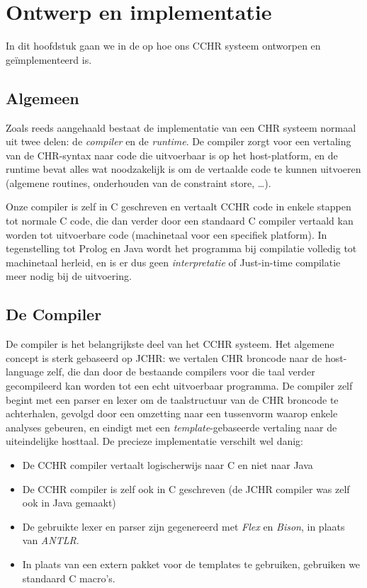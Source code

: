 \chapter{Ontwerp en implementatie}

In dit hoofdstuk gaan we in de op hoe ons CCHR systeem ontworpen en ge\"implementeerd is.

\section{Algemeen}

Zoals reeds aangehaald bestaat de implementatie van een CHR systeem normaal uit twee delen: de {\em compiler} en de {\em runtime}. De compiler zorgt voor een vertaling van de CHR-syntax naar code die uitvoerbaar is op het host-platform, en de runtime bevat alles wat noodzakelijk is om de vertaalde code te kunnen uitvoeren (algemene routines, onderhouden van de constraint store, \ldots).

Onze compiler is zelf in C geschreven en vertaalt CCHR code in enkele stappen tot normale C code, die dan verder door een standaard C compiler vertaald kan worden tot uitvoerbare code (machinetaal voor een specifiek platform). In tegenstelling tot Prolog en Java wordt het programma bij compilatie volledig tot machinetaal herleid, en is er dus geen {\em interpretatie} of {Just-in-time compilatie} meer nodig bij de uitvoering.

\section{De Compiler}

De compiler is het belangrijkste deel van het CCHR systeem. Het algemene concept is sterk gebaseerd op JCHR: we vertalen CHR broncode naar de host-language zelf, die dan door de bestaande compilers voor die taal verder gecompileerd kan worden tot een echt
uitvoerbaar programma. De compiler zelf begint met een parser en lexer om de taalstructuur van de CHR broncode te achterhalen, gevolgd door een omzetting naar een tussenvorm waarop enkele analyses gebeuren, en eindigt met een {\em template}-gebaseerde vertaling naar de uiteindelijke hosttaal. De precieze implementatie verschilt wel danig: \begin{itemize}
  \item De CCHR compiler vertaalt logischerwijs naar C en niet naar Java
  \item De CCHR compiler is zelf ook in C geschreven (de JCHR compiler was zelf ook in Java gemaakt)
  \item De gebruikte lexer en parser zijn gegenereerd met {\em Flex} en {\em Bison}, in plaats van {\em ANTLR}.
  \item In plaats van een extern pakket voor de templates te gebruiken, gebruiken we standaard C macro's.
 \end{itemize}
 
